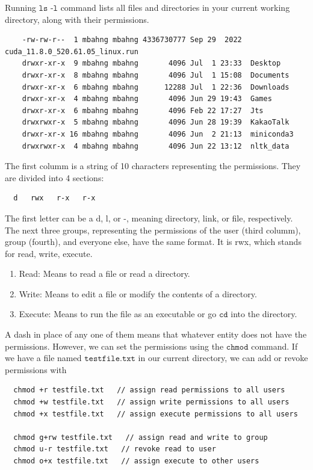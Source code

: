   Running $\texttt{ls -l}$ command lists all files and directories in your current working directory, along with their permissions. 
  \begin{lstlisting}
    -rw-rw-r--  1 mbahng mbahng 4336730777 Sep 29  2022  cuda_11.8.0_520.61.05_linux.run
    drwxr-xr-x  9 mbahng mbahng       4096 Jul  1 23:33  Desktop
    drwxr-xr-x  8 mbahng mbahng       4096 Jul  1 15:08  Documents
    drwxr-xr-x  6 mbahng mbahng      12288 Jul  1 22:36  Downloads
    drwxr-xr-x  4 mbahng mbahng       4096 Jun 29 19:43  Games
    drwxr-xr-x  6 mbahng mbahng       4096 Feb 22 17:27  Jts
    drwxrwxr-x  5 mbahng mbahng       4096 Jun 28 19:39  KakaoTalk
    drwxr-xr-x 16 mbahng mbahng       4096 Jun  2 21:13  miniconda3
    drwxrwxr-x  4 mbahng mbahng       4096 Jun 22 13:12  nltk_data
  \end{lstlisting}
  The first columm is a string of 10 characters representing the permissions. They are divided into 4 sections: 
  \begin{lstlisting}
  d   rwx   r-x   r-x 
  \end{lstlisting}
  The first letter can be a d, l, or -, meaning directory, link, or file, respectively. The next three groups, representing the permissions of the user (third columm), group (fourth), and everyone else, have the same format. It is rwx, which stands for read, write, execute. 
  \begin{enumerate}
      \item Read: Means to read a file or read a directory. 
      \item Write: Means to edit a file or modify the contents of a directory. 
      \item Execute: Means to run the file as an executable or go $\texttt{cd}$ into the directory. 
  \end{enumerate}
  A dash in place of any one of them means that whatever entity does not have the permissions. However, we can set the permissions using the $\texttt{chmod}$ command. If we have a file named $\texttt{testfile.txt}$ in our current directory, we can add or revoke permissions with 
  \begin{lstlisting}
  chmod +r testfile.txt   // assign read permissions to all users
  chmod +w testfile.txt   // assign write permissions to all users
  chmod +x testfile.txt   // assign execute permissions to all users

  chmod g+rw testfile.txt   // assign read and write to group 
  chmod u-r testfile.txt   // revoke read to user
  chmod o+x testfile.txt   // assign execute to other users 
  \end{lstlisting} 
